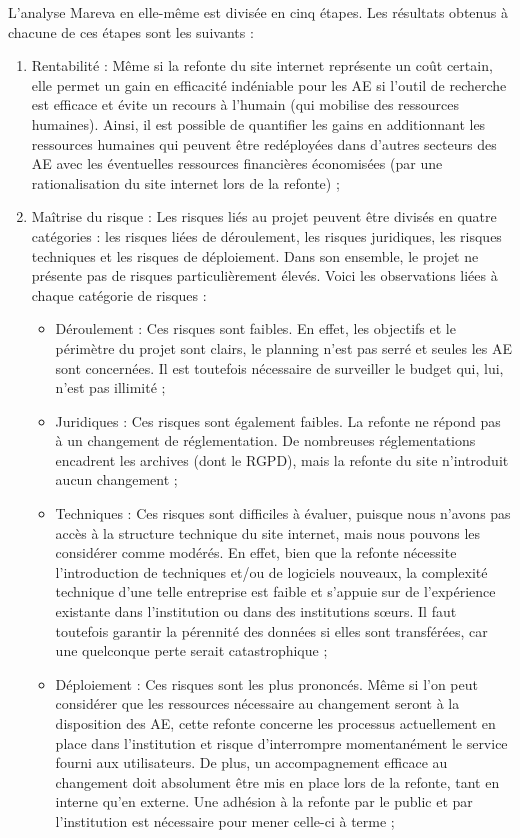 \documentclass[a4paper,12pt]{article}
\begin{document}
L'analyse Mareva en elle-même est divisée en cinq étapes. Les résultats obtenus à chacune de ces étapes sont les suivants :
\begin{enumerate}
	\item Rentabilité : Même si la refonte du site internet représente un coût certain, elle permet un gain en efficacité indéniable pour les AE si l'outil de recherche est efficace et évite un recours à l'humain (qui mobilise des ressources humaines). Ainsi, il est possible de quantifier les gains en additionnant les ressources humaines qui peuvent être redéployées dans d'autres secteurs des AE avec les éventuelles ressources financières économisées (par une rationalisation du site internet lors de la refonte) ;
	\item Maîtrise du risque : Les risques liés au projet peuvent être divisés en quatre catégories : les risques liées de déroulement, les risques juridiques, les risques techniques et les risques de déploiement. Dans son ensemble, le projet ne présente pas de risques particulièrement élevés. Voici les observations liées à chaque catégorie de risques :
	\begin{itemize}
		\item Déroulement : Ces risques sont faibles. En effet, les objectifs et le périmètre du projet sont clairs, le planning n'est pas serré et seules les AE sont concernées. Il est toutefois nécessaire de surveiller le budget qui, lui, n'est pas illimité ;
		\item Juridiques : Ces risques sont également faibles. La refonte ne répond pas à un changement de réglementation. De nombreuses réglementations encadrent les archives (dont le RGPD), mais la refonte du site n'introduit aucun changement ;
		\item Techniques : Ces risques sont difficiles à évaluer, puisque nous n'avons pas accès à la structure technique du site internet, mais nous pouvons les considérer comme modérés. En effet, bien que la refonte nécessite l'introduction de techniques et/ou de logiciels nouveaux, la complexité technique d'une telle entreprise est faible et s'appuie sur de l'expérience existante dans l'institution ou dans des institutions s\oe{}urs. Il faut toutefois garantir la pérennité des données si elles sont transférées, car une quelconque perte serait catastrophique ;
		\item Déploiement : Ces risques sont les plus prononcés. Même si l'on peut considérer que les ressources nécessaire au changement seront à la disposition des AE, cette refonte concerne les processus actuellement en place dans l'institution et risque d'interrompre momentanément le service fourni aux utilisateurs. De plus, un accompagnement efficace au changement doit absolument être mis en place lors de la refonte, tant en interne qu'en externe. Une adhésion à la refonte par le public et par l'institution est nécessaire pour mener celle-ci à terme ;

\end{itemize}
\end{enumerate}
\end{document}
